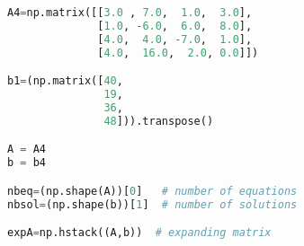 \begin{lstlisting}[language=Python, style=jupycolors]
A4=np.matrix([[3.0 , 7.0,  1.0,  3.0],
              [1.0, -6.0,  6.0,  8.0],
              [4.0,  4.0, -7.0,  1.0],
              [4.0,  16.0,  2.0, 0.0]])

b1=(np.matrix([40,
               19,
               36,
               48])).transpose()

A = A4
b = b4

nbeq=(np.shape(A))[0]   # number of equations
nbsol=(np.shape(b))[1]  # number of solutions

expA=np.hstack((A,b))  # expanding matrix
\end{lstlisting}